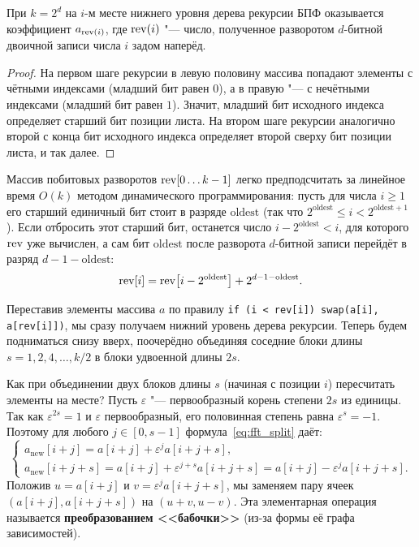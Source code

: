 \begin{proposition}
    При $k = 2^d$ на $i$-м месте нижнего уровня дерева рекурсии БПФ оказывается коэффициент $a_{\operatorname{rev}(i)}$, где $\operatorname{rev}(i)$ "--- число, полученное разворотом $d$-битной двоичной записи числа $i$ задом наперёд.
\end{proposition}

\begin{proof}
    На первом шаге рекурсии в левую половину массива попадают элементы с чётными индексами (младший бит равен $0$), а в правую "--- с нечётными индексами (младший бит равен $1$). Значит, младший бит исходного индекса определяет старший бит позиции листа. На втором шаге рекурсии аналогично второй с конца бит исходного индекса определяет второй сверху бит позиции листа, и так далее.
\end{proof}

Массив побитовых разворотов $\operatorname{rev}[0 \dots k-1]$ легко предподсчитать за линейное время $O(k)$ методом динамического программирования: пусть для числа $i \ge 1$ его старший единичный бит стоит в разряде $\text{oldest}$ (так что $2^{\text{oldest}} \le i < 2^{\text{oldest} + 1}$). Если отбросить этот старший бит, останется число $i - 2^{\text{oldest}} < i$, для которого $\operatorname{rev}$ уже вычислен, а сам бит $\text{oldest}$ после разворота $d$-битной записи перейдёт в разряд $d - 1 - \text{oldest}$:
\[
    \operatorname{rev}[i] = \operatorname{rev}\bigl[i - 2^{\text{oldest}}\bigr] + 2^{d - 1 - \text{oldest}}.
\]

Переставив элементы массива $a$ по правилу \texttt{if (i < rev[i]) swap(a[i], a[rev[i]])}, мы сразу получаем нижний уровень дерева рекурсии. Теперь будем подниматься снизу вверх, поочерёдно объединяя соседние блоки длины $s = 1, 2, 4, \dots, k/2$ в блоки удвоенной длины $2s$.

Как при объединении двух блоков длины $s$ (начиная с позиции $i$) пересчитать элементы на месте? Пусть $\varepsilon$ "--- первообразный корень степени $2s$ из единицы. Так как $\varepsilon^{2s} = 1$ и $\varepsilon$ первообразный, его половинная степень равна $\varepsilon^s = -1$. Поэтому для любого $j \in [0, s - 1]$ формула~\eqref{eq:fft_split} даёт:
\[
    \begin{cases}
        a_{\text{new}}[i + j] = a[i + j] + \varepsilon^j a[i + j + s], \\
        a_{\text{new}}[i + j + s] = a[i + j] + \varepsilon^{j + s} a[i + j + s] = a[i + j] - \varepsilon^j a[i + j + s].
    \end{cases}
\]
Положив $u = a[i + j]$ и $v = \varepsilon^j a[i + j + s]$, мы заменяем пару ячеек $(a[i + j], a[i + j + s])$ на $(u + v, u - v)$. Эта элементарная операция называется \textbf{преобразованием <<бабочки>>} (из-за формы её графа зависимостей).

